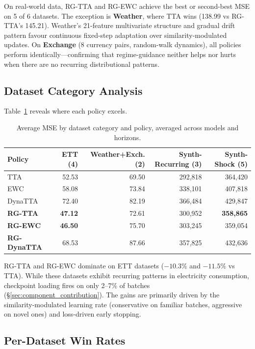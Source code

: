 \documentclass[11pt,a4paper]{article}
\begin{document}
On real-world data, RG-TTA and RG-EWC achieve the best or second-best MSE on 5 of 6 datasets. The exception is \textbf{Weather}, where TTA wins (138.99 vs RG-TTA's 145.21). Weather's 21-feature multivariate structure and gradual drift pattern favour continuous fixed-step adaptation over similarity-modulated updates. On \textbf{Exchange} (8 currency pairs, random-walk dynamics), all policies perform identically---confirming that regime-guidance neither helps nor hurts when there are no recurring distributional patterns.

\subsection{Dataset Category Analysis}

Table~\ref{tab:bycategory} reveals where each policy excels.

\begin{table}[t]
\centering
\caption{Average MSE by dataset category and policy, averaged across models and horizons.}
\label{tab:bycategory}
\small
\begin{tabular}{lrrrr}
\toprule
Policy & ETT (4) & Weather+Exch. (2) & Synth-Recurring (3) & Synth-Shock (5) \\
\midrule
TTA & 52.53 & 69.50 & 292,818 & 364,420 \\
EWC & 58.08 & 73.84 & 338,101 & 407,818 \\
DynaTTA & 72.40 & 82.19 & 366,484 & 429,847 \\
\midrule
\textbf{RG-TTA} & \textbf{47.12} & 72.61 & 300,952 & \textbf{358,865} \\
\textbf{RG-EWC} & \textbf{46.50} & 75.70 & 303,245 & 359,054 \\
\textbf{RG-DynaTTA} & 68.53 & 87.66 & 357,825 & 432,636 \\
\bottomrule
\end{tabular}
\end{table}

RG-TTA and RG-EWC dominate on ETT datasets ($-10.3\%$ and $-11.5\%$ vs TTA). While these datasets exhibit recurring patterns in electricity consumption, checkpoint loading fires on only 2--7\% of batches (\S\ref{sec:component_contribution}). The gains are primarily driven by the similarity-modulated learning rate (conservative on familiar batches, aggressive on novel ones) and loss-driven early stopping.

\subsection{Per-Dataset Win Rates}
\end{document}
